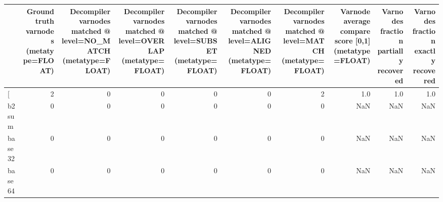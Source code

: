 \begin{tabular}{lrrrrrrrrr}
\toprule
{} &  Ground truth varnodes (metatype=FLOAT) &  Decompiler varnodes matched @ level=NO\_MATCH (metatype=FLOAT) &  Decompiler varnodes matched @ level=OVERLAP (metatype=FLOAT) &  Decompiler varnodes matched @ level=SUBSET (metatype=FLOAT) &  Decompiler varnodes matched @ level=ALIGNED (metatype=FLOAT) &  Decompiler varnodes matched @ level=MATCH (metatype=FLOAT) &  Varnode average compare score [0,1] (metatype=FLOAT) &  Varnodes fraction partially recovered &  Varnodes fraction exactly recovered \\
\midrule
[         &                                       2 &                                                  0 &                                                  0 &                                                  0 &                                                  0 &                                                  2 &                                                1.0 &                                    1.0 &                                  1.0 \\
b2sum     &                                       0 &                                                  0 &                                                  0 &                                                  0 &                                                  0 &                                                  0 &                                                NaN &                                    NaN &                                  NaN \\
base32    &                                       0 &                                                  0 &                                                  0 &                                                  0 &                                                  0 &                                                  0 &                                                NaN &                                    NaN &                                  NaN \\
base64    &                                       0 &                                                  0 &                                                  0 &                                                  0 &                                                  0 &                                                  0 &                                                NaN &                                    NaN &                                  NaN \\

\end{tabular}
